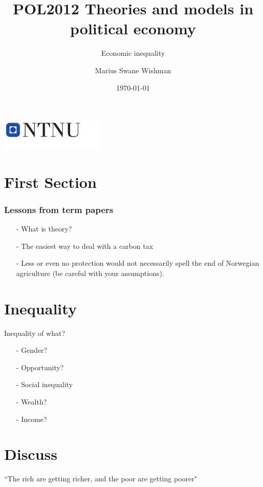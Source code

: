 \documentclass{beamer}
\title[POL2012]{POL2012 Theories and models in political economy}
\subtitle{Economic inequality}
\author[Wishman]{Marius Swane Wishman}
\date{\today}
\institute{ISS}
\begin{document}
\begin{frame}[plain]
\titlepage 
\centering
\includegraphics[width=5cm]{logo_ntnu_u-slagord.pdf} 
\end{frame}

\section{First Section} 

\begin{frame}
\frametitle{Lessons from term papers}

\begin{itemize}
	\item[-] What is theory? \pause
	\item[-] The easiest way to deal with a carbon tax \pause
	\item[-] Less or even no protection would not necessarily spell the end
		of Norwegian agriculture (be careful with your assumptions).
\end{itemize}
	
\end{frame}
\section{Inequality}

\begin{frame}{Inequality of what?}
\begin{itemize}    
    \item[-]Gender?\pause
    \item[-]Opportunity?\pause
    \item[-]Social inequality\pause
    \item[-]Wealth?\pause
    \item[-]Income?
\end{itemize}{}
\end{frame}{}

\section{Discuss}
\begin{frame}{}
\centering
\alert{\Large{``The rich are getting richer, and the poor are getting poorer"}}
\end{frame}{}
\end{document}
